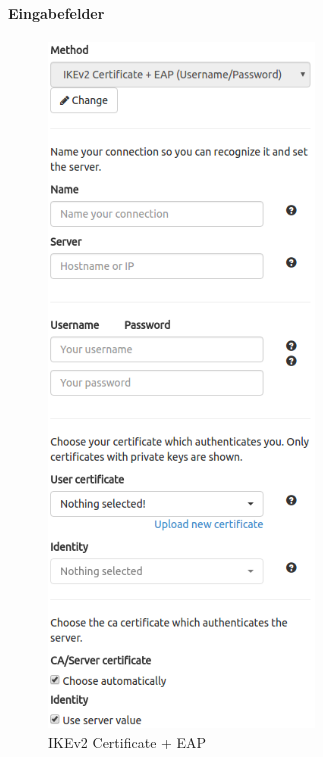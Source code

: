 \noindent\begin{minipage}[t]{0.5\textwidth}
\vspace{0pt}
\paragraph{Eingabefelder}\mbox{}\medskip
    \begin{figure}[H]
    	\centering
    	\includegraphics[width=200pt]{images/ike_cert_eap.png}
    	\caption{IKEv2 Certificate + EAP}
    \end{figure}
\end{minipage}
\hfill
